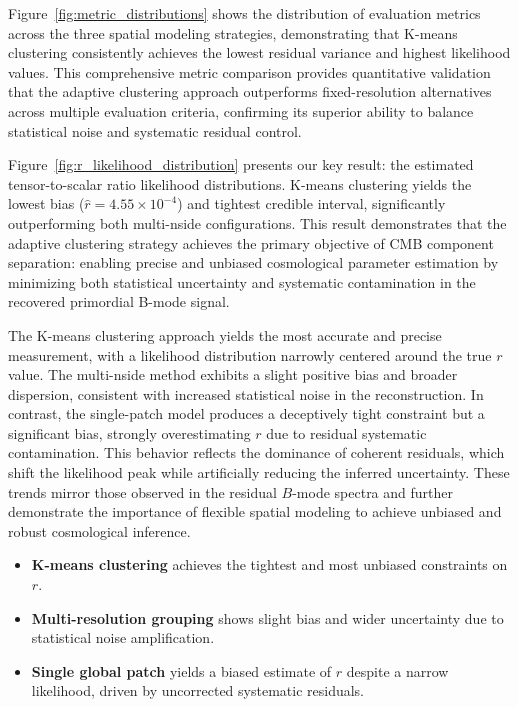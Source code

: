 \documentclass[fleqn,usenatbib]{mnras}
\begin{document}
Figure~\ref{fig:metric_distributions} shows the distribution of evaluation metrics across the three spatial modeling strategies, demonstrating that K-means clustering consistently achieves the lowest residual variance and highest likelihood values. This comprehensive metric comparison provides quantitative validation that the adaptive clustering approach outperforms fixed-resolution alternatives across multiple evaluation criteria, confirming its superior ability to balance statistical noise and systematic residual control.

Figure~\ref{fig:r_likelihood_distribution} presents our key result: the estimated tensor-to-scalar ratio likelihood distributions. K-means clustering yields the lowest bias (\( \hat{r} = 4.55 \times 10^{-4} \)) and tightest credible interval, significantly outperforming both multi-nside configurations. This result demonstrates that the adaptive clustering strategy achieves the primary objective of CMB component separation: enabling precise and unbiased cosmological parameter estimation by minimizing both statistical uncertainty and systematic contamination in the recovered primordial B-mode signal.

The K-means clustering approach yields the most accurate and precise measurement, with a likelihood distribution narrowly centered around the true \( r \) value. 
The multi-nside method exhibits a slight positive bias and broader dispersion, consistent with increased statistical noise in the reconstruction. 
In contrast, the single-patch model produces a deceptively tight constraint but a significant bias, strongly overestimating \( r \) due to residual systematic contamination.
This behavior reflects the dominance of coherent residuals, which shift the likelihood peak while artificially reducing the inferred uncertainty.
These trends mirror those observed in the residual \( B \)-mode spectra and further demonstrate the importance of flexible spatial modeling to achieve unbiased and robust cosmological inference.

\begin{itemize}
    \item \textbf{K-means clustering} achieves the tightest and most unbiased constraints on \( r \).
    \item \textbf{Multi-resolution grouping} shows slight bias and wider uncertainty due to statistical noise amplification.
    \item \textbf{Single global patch} yields a biased estimate of \( r \) despite a narrow likelihood, driven by uncorrected systematic residuals.
\end{itemize}
\end{document}
